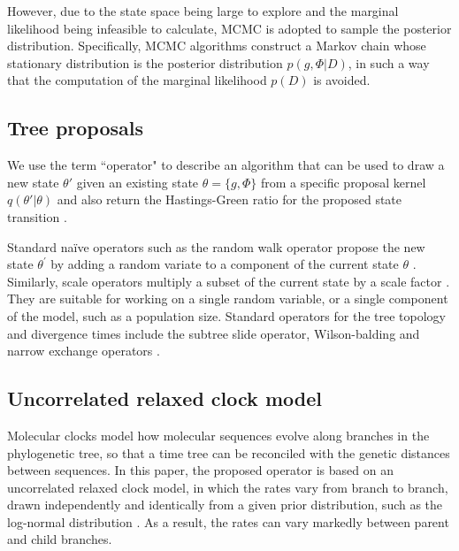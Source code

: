 \documentclass{bmcart}
\begin{document}
However, due to the state space being large to explore and the marginal likelihood being infeasible to calculate, MCMC is adopted to sample the posterior distribution. Specifically, MCMC algorithms construct a Markov chain whose stationary distribution is the posterior distribution $p(g,\Phi |D)$, in such a way that the computation of the marginal likelihood $p (D)$ is avoided. 
\subsection*{Tree proposals}
\label{treeproposals}
We use the term ``operator" to describe an algorithm that can be used to draw a new state $\theta'$ given an existing state $\theta = \{g,\Phi\}$ from a specific proposal kernel $q(\theta'|\theta)$ and also return the Hastings-Green ratio for the proposed state transition \cite{hastings1970monte,green1995reversible}. 

Standard na\"{i}ve operators such as the random walk operator propose the new state $\theta^\prime$ by adding a random variate to a component of the current state $\theta$ \cite{suchard2005stochastic}. Similarly, scale operators multiply a subset of the current state by a scale factor \cite{higuchi1997monte}. They are suitable for working on a single random variable, or a single component of the model, such as a population size. Standard operators for the tree topology and divergence times include the subtree slide operator, Wilson-balding and narrow exchange operators \cite{drummond2002estimatingdata,hohna2008clock}. 

\subsection*{Uncorrelated relaxed clock model}
Molecular clocks model how molecular sequences evolve along branches in the phylogenetic tree, so that a time tree can be reconciled with the genetic distances between sequences. In this paper, the proposed operator is based on an uncorrelated relaxed clock model, in which the rates vary from branch to branch, drawn independently and identically from a given prior distribution, such as the log-normal distribution \cite{drummond2006relaxed}. As a result, the rates can vary markedly between parent and child branches. 
\end{document}
